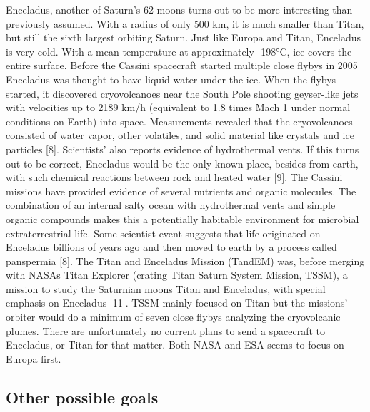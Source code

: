 Enceladus, another of Saturn’s 62 moons turns out to be more interesting than previously assumed.
With a radius of only 500 km, it is much smaller than Titan, but still the sixth largest orbiting Saturn.
Just like Europa and Titan, Enceladus is very cold.
With a mean temperature at approximately -198°C, ice covers the entire surface.
Before the Cassini spacecraft started multiple close flybys in 2005 Enceladus was thought to have liquid water under the ice.
When the flybys started, it discovered cryovolcanoes near the South Pole shooting geyser-like jets with velocities up to 2189 km/h (equivalent to 1.8 times Mach 1 under normal conditions on Earth) into space.
Measurements revealed that the cryovolcanoes consisted of water vapor, other volatiles, and solid material like crystals and ice particles [8].
Scientists’ also reports evidence of hydrothermal vents.
If this turns out to be correct, Enceladus would be the only known place, besides from earth, with such chemical reactions between rock and heated water [9].
The Cassini missions have provided evidence of several nutrients and organic molecules.
The combination of an internal salty ocean with hydrothermal vents and simple organic compounds makes this a potentially habitable environment for microbial extraterrestrial life.
Some scientist event suggests that life originated on Enceladus billions of years ago and then moved to earth by a process called panspermia [8].
The Titan and Enceladus Mission (TandEM) was, before merging with NASAs Titan Explorer (crating Titan Saturn System Mission, TSSM), a mission to study the Saturnian moons Titan and Enceladus, with special emphasis on Enceladus [11].
TSSM mainly focused on Titan but the missions’ orbiter would do a minimum of seven close flybys analyzing the cryovolcanic plumes.
There are unfortunately no current plans to send a spacecraft to Enceladus, or Titan for that matter.
Both NASA and ESA seems to focus on Europa first.

\subsection*{Other possible goals}

